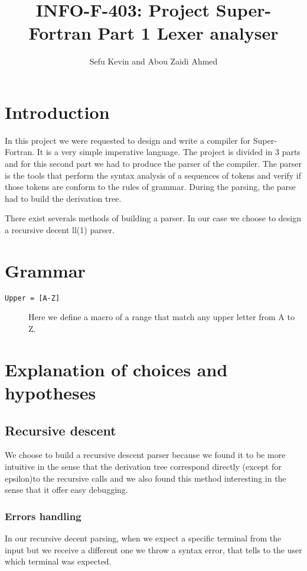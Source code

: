 \documentclass[12pt]{article}
\title{INFO-F-403: Project Super-Fortran Part 1 Lexer analyser}
\author{Sefu Kevin and Abou Zaidi Ahmed}
\begin{document}
\maketitle
\section{Introduction}
In this project we were requested to design and write a compiler for Super-Fortran. It is a very simple 
imperative language. The project is divided in 3 parts and for this second part we had to produce 
the parser of the compiler. The parser is the tools that perform the syntax analysis of a sequences of tokens and verify if
those tokens are conform to the rules of grammar. During the parsing, the parse had to build the derivation tree.

There exist severals methods of building a parser. In our case we choose to design a recursive decent ll(1) parser.

\section{Grammar}


\begin{description}
    \item[\texttt{Upper = [A-Z]}]
    Here we define a macro of a range that match any upper letter from A to Z.
\end{description}

\section{Explanation of choices and hypotheses}

\subsection{Recursive descent}
We choose to build a recursive descent parser because we found it to be more intuitive in the sense
that the derivation tree correspond directly (except for epsilon)to the recursive calls and we also 
found this method interesting in the sense that it offer easy debugging.

\subsubsection{Errors handling}
In our recursive decent parsing, when we expect a specific terminal from the input but 
we receive a different one we throw a syntax error, that tells to the user which terminal was expected.  
\end{document}
